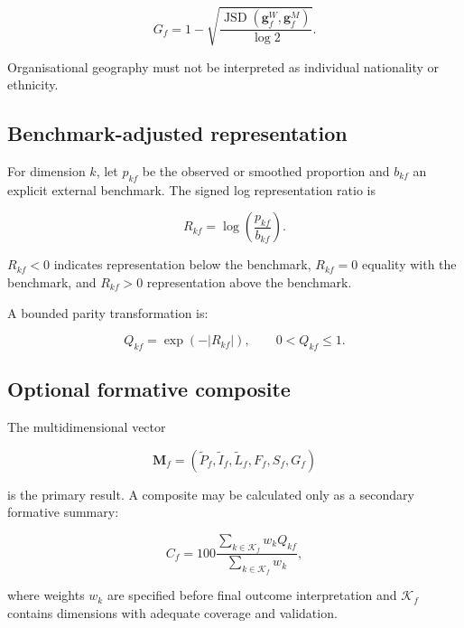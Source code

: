 \begin{equation}
G_f
=
1-
\sqrt{
\frac{
\operatorname{JSD}
\left(
\mathbf{g}_{f}^{W},
\mathbf{g}_{f}^{M}
\right)
}{
\log 2
}
}.
\end{equation}

Organisational geography must not be interpreted as individual nationality or
ethnicity.

\subsection{Benchmark-adjusted representation}

For dimension $k$, let $p_{kf}$ be the observed or smoothed proportion and
$b_{kf}$ an explicit external benchmark. The signed log representation ratio is

\begin{equation}
R_{kf}
=
\log
\left(
\frac{p_{kf}}{b_{kf}}
\right).
\end{equation}

$R_{kf}<0$ indicates representation below the benchmark, $R_{kf}=0$ equality
with the benchmark, and $R_{kf}>0$ representation above the benchmark.

A bounded parity transformation is:

\begin{equation}
Q_{kf}
=
\exp
\left(
-|R_{kf}|
\right),
\qquad
0<Q_{kf}\leq 1.
\end{equation}

\subsection{Optional formative composite}

The multidimensional vector

\begin{equation}
\mathbf{M}_{f}
=
\left(
\widetilde{P}_{f},
\widetilde{I}_{f},
\widetilde{L}_{f},
F_f,
S_f,
G_f
\right)
\end{equation}

is the primary result. A composite may be calculated only as a secondary
formative summary:

\begin{equation}
C_f
=
100
\frac{
\sum_{k \in \mathcal{K}_{f}}w_kQ_{kf}
}{
\sum_{k \in \mathcal{K}_{f}}w_k
},
\end{equation}

where weights $w_k$ are specified before final outcome interpretation and
$\mathcal{K}_{f}$ contains dimensions with adequate coverage and validation.

